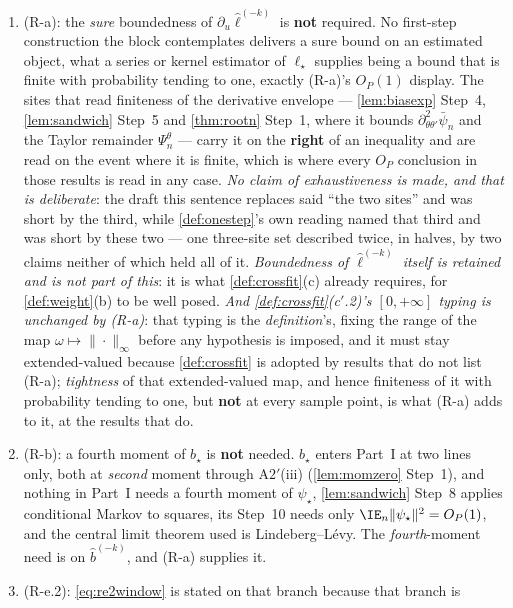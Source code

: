 \begin{remark}
\begin{enumerate}
delivered by nothing.
\item[(3)] \textup{(R-a)}: the \emph{sure} boundedness of $\partial_u\hat\ell^{(-k)}$ is
\textbf{not} required. No first-step construction the block contemplates delivers a sure bound on an
estimated object, what a series or kernel estimator of $\ell_\star$ supplies being a bound that is finite
with probability tending to one, exactly (R-a)'s $O_P(1)$ display. The sites that read finiteness
of the derivative envelope --- \cref{lem:biasexp} Step~4, \cref{lem:sandwich} Step~5 and
\cref{thm:rootn} Step~1, where it bounds $\partial^{2}_{\theta\theta'}\bar\psi_n$ and the Taylor
remainder $\Psi^{\theta}_n$ --- carry it on the
\textbf{right} of an inequality and are read on the event where it is finite, which is where every $O_P$
conclusion in those results is read in any case. \emph{No claim of exhaustiveness is made, and that
is deliberate}: the draft this sentence replaces said ``the two sites'' and was short by the third,
while \cref{def:onestep}'s own reading named that third and was short by these two --- one three-site
set described twice, in halves, by two claims neither of which held all of it. \emph{Boundedness of $\hat\ell^{(-k)}$ itself is
retained and is not part of this}: it is what \cref{def:crossfit}\textup{(c)} already requires, for
\cref{def:weight}(b) to be well posed. \emph{And \cref{def:crossfit}\textup{(c$'$.2)}'s $[0,+\infty]$
typing is unchanged by (R-a)}: that typing is the \emph{definition}'s, fixing the range of the map
$\omega\mapsto\|\cdot\|_\infty$ before any hypothesis is imposed, and it must stay extended-valued because
\cref{def:crossfit} is adopted by results that do not list (R-a); \emph{tightness} of that
extended-valued map, and hence finiteness of it with probability tending to one, but \textbf{not} at
every sample point, is what (R-a) adds to it, at the results that do.
\item[(4)] \textup{(R-b)}: a fourth moment of $b_\star$ is \textbf{not} needed. $b_\star$ enters
Part~I at two lines only, both at \emph{second} moment through A$2'$(iii) (\cref{lem:momzero} Step~1), and
nothing in Part~I needs a fourth moment of $\psi_\star$, \cref{lem:sandwich} Step~8 applies conditional
Markov to squares, its Step~10 needs only $\IE_n\|\psi_\star\|^{2}=O_P(1)$, and the central limit theorem
used is Lindeberg--L\'evy. The \emph{fourth}-moment need is on $\hat b^{(-k)}$, and (R-a) supplies it.
\item[(5)] \textup{(R-e.2)}: \eqref{eq:re2window} is stated on that branch because that branch is

\end{enumerate}
\end{remark}
